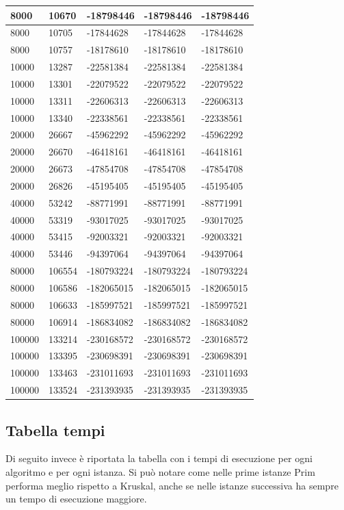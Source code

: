 \begin{longtable}[H]{|p{1.5cm}|p{1.5cm}|p{1.5cm}|p{3cm}|p{3.5cm}|}
    8000 & 10670 & -18798446 & -18798446 & -18798446 \\ \hline  
    8000 & 10705 & -17844628 & -17844628 & -17844628 \\ \hline
    8000 & 10757 & -18178610 & -18178610 & -18178610 \\ \hline  
    10000 & 13287 & -22581384 & -22581384 & -22581384 \\ \hline
    10000 & 13301 & -22079522 & -22079522 & -22079522 \\ \hline
    10000 & 13311 & -22606313 & -22606313 & -22606313 \\ \hline
    10000 & 13340 & -22338561 & -22338561 & -22338561 \\ \hline 
    20000 & 26667 & -45962292 & -45962292 & -45962292 \\ \hline
    20000 & 26670 & -46418161 & -46418161 & -46418161 \\ \hline
    20000 & 26673 & -47854708 & -47854708 & -47854708 \\ \hline
    20000 & 26826 & -45195405 & -45195405 & -45195405 \\ \hline
    40000 & 53242 & -88771991 & -88771991 & -88771991 \\ \hline
    40000 & 53319 & -93017025 & -93017025 & -93017025 \\ \hline
    40000 & 53415 & -92003321 & -92003321 & -92003321 \\ \hline
    40000 & 53446 & -94397064 & -94397064 & -94397064 \\ \hline
    80000 & 106554 & -180793224 & -180793224 & -180793224 \\ \hline 
    80000 & 106586 & -182065015 & -182065015 & -182065015 \\ \hline 
    80000 & 106633 & -185997521 & -185997521 & -185997521 \\ \hline
    80000 & 106914 & -186834082 & -186834082 & -186834082 \\ \hline
    100000 & 133214 & -230168572 & -230168572 & -230168572 \\ \hline
    100000 & 133395 & -230698391 & -230698391 & -230698391 \\ \hline
    100000 & 133463 & -231011693 & -231011693 & -231011693 \\ \hline
    100000 & 133524 & -231393935 & -231393935 & -231393935  \\ \hline
\end{longtable}
\newpage
\subsection{Tabella tempi}
\label{tabella\_tempi}
Di seguito invece è riportata la tabella con i tempi di esecuzione per ogni algoritmo e per ogni istanza. Si può notare come nelle prime istanze Prim performa meglio rispetto a Kruskal, anche se nelle istanze successiva ha sempre un tempo di esecuzione maggiore.


